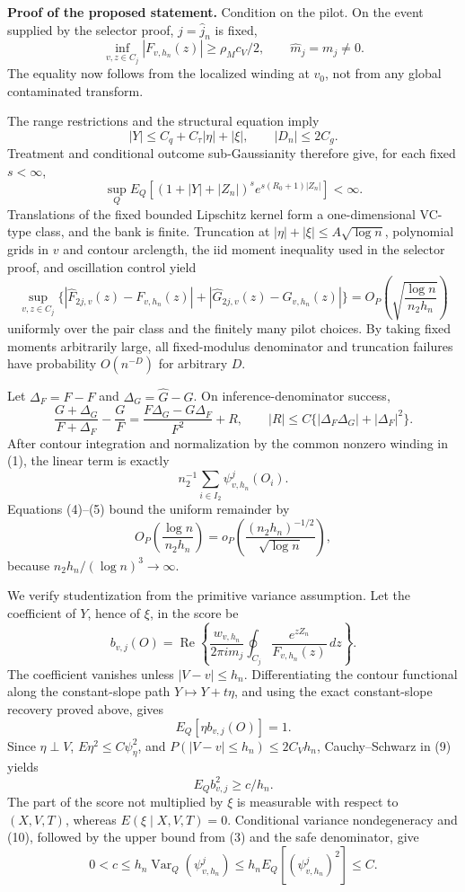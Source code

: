 \textbf{Proof of the proposed statement.}
Condition on the pilot.  On the event supplied by the selector proof, \(j=\widehat j_n\) is fixed,
\[
 \inf_{v,z\in C_j}|F_{v,h_n}(z)|\ge\rho_Mc_V/2,
 \qquad \widehat m_j=m_j\ne0. \tag{1}
\]
The equality now follows from the localized winding at \(v_0\), not from any global contaminated transform.

The range restrictions and the structural equation imply
\[
 |Y|\le C_q+C_\tau|\eta|+|\xi|,\qquad |D_n|\le2C_g. \tag{2}
\]
Treatment and conditional outcome sub-Gaussianity therefore give, for each fixed \(s<\infty\),
\[
 \sup_QE_Q[(1+|Y|+|Z_n|)^s
 e^{s(R_0+1)|Z_n|}]<\infty. \tag{3}
\]
Translations of the fixed bounded Lipschitz kernel form a one-dimensional VC-type class, and the bank is finite.  Truncation at
\(|\eta|+|\xi|\le A\sqrt{\log n}\), polynomial grids in \(v\) and contour arclength, the iid moment inequality used in the selector proof, and oscillation control yield
\[
 \sup_{v,z\in C_j}
 \{|\widehat F_{2j,v}(z)-F_{v,h_n}(z)|
 +|\widehat G_{2j,v}(z)-G_{v,h_n}(z)|\}
 =O_P\!\left(\sqrt{\frac{\log n}{n_2h_n}}\right) \tag{4}
\]
uniformly over the pair class and the finitely many pilot choices.  By taking fixed moments arbitrarily large, all fixed-modulus denominator and truncation failures have probability \(O(n^{-D})\) for arbitrary \(D\).

Let \(\Delta_F=\widehat F-F\) and \(\Delta_G=\widehat G-G\).  On inference-denominator success,
\[
 \frac{G+\Delta_G}{F+\Delta_F}-\frac GF
 =\frac{F\Delta_G-G\Delta_F}{F^2}+R,\qquad
 |R|\le C\{|\Delta_F\Delta_G|+|\Delta_F|^2\}. \tag{5}
\]
After contour integration and normalization by the common nonzero winding in (1), the linear term is exactly
\[
 n_2^{-1}\sum_{i\in I_2}\psi^j_{v,h_n}(O_i). \tag{6}
\]
Equations (4)--(5) bound the uniform remainder by
\[
 O_P\!\left(\frac{\log n}{n_2h_n}\right)
 =o_P\!\left(\frac{(n_2h_n)^{-1/2}}{\sqrt{\log n}}\right), \tag{7}
\]
because \(n_2h_n/(\log n)^3\to\infty\).

We verify studentization from the primitive variance assumption.  Let the coefficient of \(Y\), hence of \(\xi\), in the score be
\[
 b_{v,j}(O)=\operatorname{Re}\left\{
 \frac{w_{v,h_n}}{2\pi i m_j}
 \oint_{C_j}\frac{e^{zZ_n}}{F_{v,h_n}(z)}\,dz\right\}. \tag{8}
\]
The coefficient vanishes unless \(|V-v|\le h_n\).  Differentiating the contour functional along the constant-slope path
\(Y\mapsto Y+t\eta\), and using the exact constant-slope recovery proved above, gives
\[
 E_Q[\eta b_{v,j}(O)]=1. \tag{9}
\]
Since \(\eta\perp V\), \(E\eta^2\le C\psi_\eta^2\), and
\(P(|V-v|\le h_n)\le2C_Vh_n\), Cauchy--Schwarz in (9) yields
\[
 E_Qb_{v,j}^2\ge c/h_n. \tag{10}
\]
The part of the score not multiplied by \(\xi\) is measurable with respect to
\((X,V,T)\), whereas \(E(\xi\mid X,V,T)=0\).  Conditional variance nondegeneracy and (10), followed by the upper bound from (3) and the safe denominator, give
\[
 0<c\le h_n\operatorname{Var}_Q(\psi^j_{v,h_n})
 \le h_nE_Q[(\psi^j_{v,h_n})^2]\le C. \tag{11}
\]

